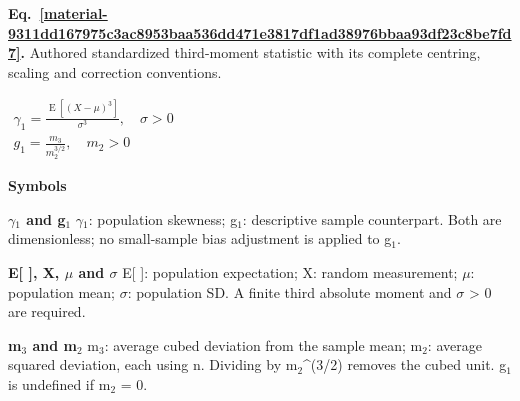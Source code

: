 \documentclass[11pt,a4paper]{article}
\begin{document}
\par\medskip
\begin{samepage}
\label{material-9311dd167975c3ac8953baa536dd471e3817df1ad38976bbaa93df23c8be7fd7}
\noindent\textbf{Eq.~\ref*{material-9311dd167975c3ac8953baa536dd471e3817df1ad38976bbaa93df23c8be7fd7}.} Authored standardized third-moment statistic with its complete centring, scaling and correction conventions.\par\nopagebreak
\begin{center}\begin{adjustbox}{max width=\linewidth}$\displaystyle \begin{gathered}\gamma_1=\frac{\operatorname{E}[(X-\mu)^3]}{\sigma^3},\quad\sigma>0\\g_1=\frac{m_3}{m_2^{3/2}},\quad m_2>0\end{gathered}$\end{adjustbox}\end{center}

\par\noindent\textbf{Symbols}

\par\noindent\textbf{\ensuremath{\gamma}\ensuremath{{}_1} and g\ensuremath{{}_1}} \ensuremath{\gamma}\ensuremath{{}_1}: population skewness; g\ensuremath{{}_1}: descriptive sample counterpart. Both are dimensionless; no small-sample bias adjustment is applied to g\ensuremath{{}_1}.

\par\noindent\textbf{E[ ], X, \ensuremath{\mu} and \ensuremath{\sigma}} E[ ]: population expectation; X: random measurement; \ensuremath{\mu}: population mean; \ensuremath{\sigma}: population SD. A finite third absolute moment and \ensuremath{\sigma} > 0 are required.

\par\noindent\textbf{m\ensuremath{{}_3} and m\ensuremath{{}_2}} m\ensuremath{{}_3}: average cubed deviation from the sample mean; m\ensuremath{{}_2}: average squared deviation, each using n. Dividing by m\ensuremath{{}_2}\textasciicircum{}(3/2) removes the cubed unit. g\ensuremath{{}_1} is undefined if m\ensuremath{{}_2} = 0.

\end{samepage}
\medskip
\end{document}
